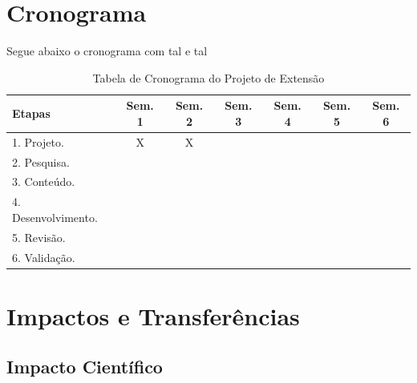 \documentclass[a4paper,12pt]{article} %
\begin{document}
\section{Cronograma}


Segue abaixo o cronograma com tal e tal

\begin{table}[H]
\begin{center}
 \caption{Tabela de Cronograma do Projeto de Extensão}
\begin{tabular}{|l|c|c|c|c|c|c|}
  \hline \hline
   \textbf{Etapas} & \textbf{Sem. 1} & \textbf{Sem. 2} & \textbf{Sem. 3} & \textbf{Sem. 4} & \textbf{Sem. 5} & \textbf{Sem. 6} \\ \hline \hline
   1. Projeto. & X & X &  &  &  &  \\ \hline
   2. Pesquisa. &  &  &  &  &  &  \\ \hline
   3. Conteúdo. &  &  &  &  &  &  \\ \hline
   4. Desenvolvimento. &  &  &  &  &  &  \\ \hline
   5. Revisão. &  &  &  &  &  &  \\ \hline
   6. Validação. &  &  &  &  &  &  \\ \hline \hline
\end{tabular}
\label{tab:cronograma}
\end{center}
\end{table}


\section{Impactos e Transferências}


\subsection{Impacto Científico}
\end{document}
